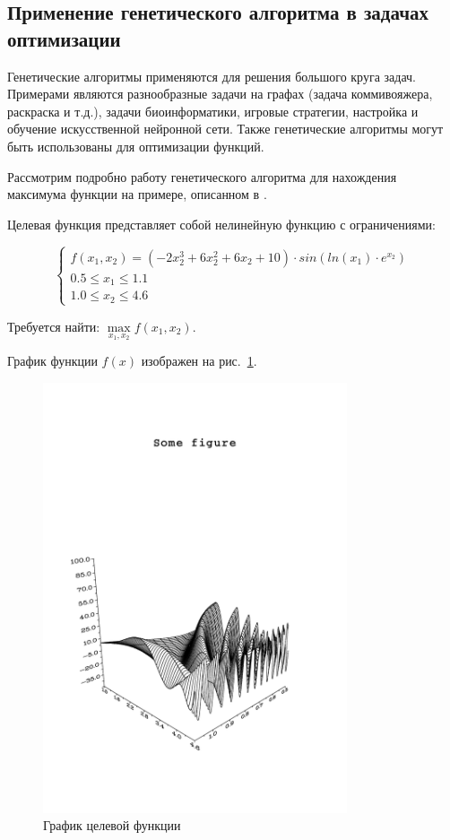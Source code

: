 \subsection{Применение генетического алгоритма в задачах оптимизации}
\label{sec:1d}

Генетические алгоритмы применяются для решения большого круга задач.
Примерами являются разнообразные задачи на графах (задача коммивояжера, раскраска и т.д.),
задачи биоинформатики, игровые стратегии, настройка и обучение искусственной нейронной сети.
Также генетические алгоритмы могут быть использованы для оптимизации функций.

Рассмотрим подробно работу генетического алгоритма для нахождения максимума функции на
примере, описанном в \cite{Rotshtein1999}.

Целевая функция представляет собой нелинейную функцию с ограничениями:

\begin{equation}
  \left \{
    \begin{array}{ll}
    f(x_{1}, x_{2}) = (-2x_{2}^{3} + 6x_{2}^{2} + 6x_{2} + 10) \cdot sin(ln(x_{1})\cdot e^{x_{2}}) \\
    0.5 \leq x_{1} \leq 1.1 \\
    1.0 \leq x_{2} \leq 4.6
    \end{array}
  \right .
\end{equation}

Требуется найти: $\max\limits_{x_{1}, x_{2}} f(x_1, x_2)$.

График функции $f(x)$ изображен на рис.~\ref{gen_example_pic}.

\begin{figure}[ht!]
\centering
  \includegraphics[trim=30 100 30 330, clip, width=0.8\textwidth]{./FIGs/gen_example.pdf}
\caption{График целевой функции}
\label{gen_example_pic}
\end{figure}


